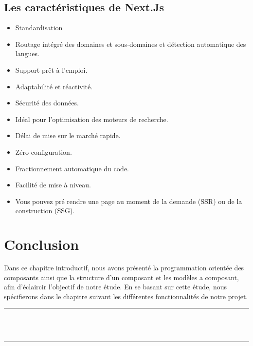 \documentclass[12pt]{report}
\begin{document}
\newpage

\vspace*{0.1in}

\subsection{Les caractéristiques de Next.Js}
\vspace{0.1in}

\begin{itemize}
    \item Standardisation
    \item Routage intégré des domaines et sous-domaines et détection automatique des langues.
    \item Support prêt à l’emploi.
    \item Adaptabilité et réactivité.
    \item Sécurité des données.
    \item Idéal pour l’optimisation des moteurs de recherche.
    \item Délai de mise sur le marché rapide.
    \item Zéro configuration.
    \item Fractionnement automatique du code.
    \item Facilité de mise à niveau.
    \item Vous pouvez pré rendre une page au moment de la demande (SSR) ou de la construction (SSG).
\end{itemize}

\section{Conclusion}
\vspace{0.1in}
\hspace*{0.16in}
Dans ce chapitre introductif, nous avons présenté la programmation orientée des composants ainsi que la structure d’un composant et les modèles a composant, afin d’éclaircir l’objectif de notre étude. En se basant sur cette étude, nous spécifierons dans le chapitre suivant les différentes fonctionnalités de notre projet.

\newpage

\vspace*{\fill}
\begin{center}
    {\color{Blue} \rule{\linewidth}{1.2mm} }\\
\vspace{0.25in}
    {\centering{}}
\vspace{0.35in}\\
    {\color{Blue} \rule{\linewidth}{1.2mm} }
\end{center}
\vspace*{\fill}
\setcounter{section}{0}
\end{document}
